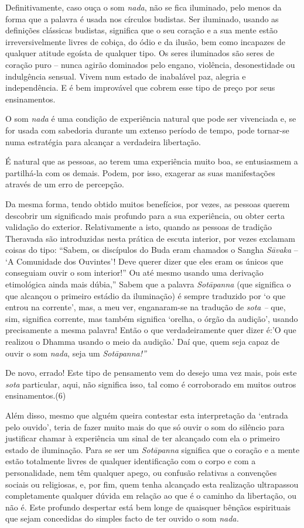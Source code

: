 Definitivamente, caso ouça o som \emph{nada}, não se fica iluminado,
pelo menos da forma que a palavra é usada nos círculos budistas. Ser
iluminado, usando as definições clássicas budistas, significa que o seu
coração e a sua mente estão irreversivelmente livres de cobiça, do ódio
e da ilusão, bem como incapazes de qualquer atitude egoísta de qualquer
tipo. Os seres iluminados são seres de coração puro -- nunca agirão
dominados pelo engano, violência, desonestidade ou indulgência sensual.
Vivem num estado de inabalável paz, alegria e independência. E é bem
improvável que cobrem esse tipo de preço por seus ensinamentos.

O som \emph{nada} é uma condição de experiência natural que pode ser
vivenciada e, se for usada com sabedoria durante um extenso período de
tempo, pode tornar-se numa estratégia para alcançar a verdadeira
libertação.

É natural que as pessoas, ao terem uma experiência muito boa, se
entusiasmem a partilhá-la com os demais. Podem, por isso, exagerar as
suas manifestações através de um erro de percepção.

Da mesma forma, tendo obtido muitos benefícios, por vezes, as pessoas
querem descobrir um significado mais profundo para a sua experiência, ou
obter certa validação do exterior. Relativamente a isto, quando as
pessoas de tradição Theravada são introduzidas nesta prática de escuta
interior, por vezes exclamam coisas do tipo: ``Sabem, os discípulos do
Buda eram chamados o Sangha \emph{Sāvaka} -- `A Comunidade dos
Ouvintes'! Deve querer dizer que eles eram os únicos que conseguiam
ouvir o som interior!'' Ou até mesmo usando uma derivação etimológica
ainda mais dúbia,'' Sabem que a palavra \emph{Sotāpanna} (que significa
o que alcançou o primeiro estádio da iluminação) é sempre traduzido por
`o que entrou na corrente', mas, a meu ver, enganaram-se na tradução de
\emph{sota --} que, sim, significa corrente, mas também significa
`orelha, o órgão da audição', usando precisamente a mesma palavra! Então
o que verdadeiramente quer dizer é:'O que realizou o Dhamma usando o
meio da audição.' Daí que, quem seja capaz de ouvir o som \emph{nada},
seja um \emph{Sotāpanna!''}

De novo, errado! Este tipo de pensamento vem do desejo uma vez mais,
pois este \emph{sota} particular, aqui, não significa isso, tal como é
corroborado em muitos outros ensinamentos.(6)

Além disso, mesmo que alguém queira contestar esta interpretação da
`entrada pelo ouvido', teria de fazer muito mais do que só ouvir o som
do silêncio para justificar chamar à experiência um sinal de ter
alcançado com ela o primeiro estado de iluminação. Para se ser um
\emph{Sotāpanna} significa que o coração e a mente estão totalmente
livres de qualquer identificação com o corpo e com a personalidade, nem
têm qualquer apego, ou confusão relativas a convenções sociais ou
religiosas, e, por fim, quem tenha alcançado esta realização ultrapassou
completamente qualquer dúvida em relação ao que é o caminho da
libertação, ou não é. Este profundo despertar está bem longe de
quaisquer bênçãos espirituais que sejam concedidas do simples facto de
ter ouvido o som \emph{nada.}

